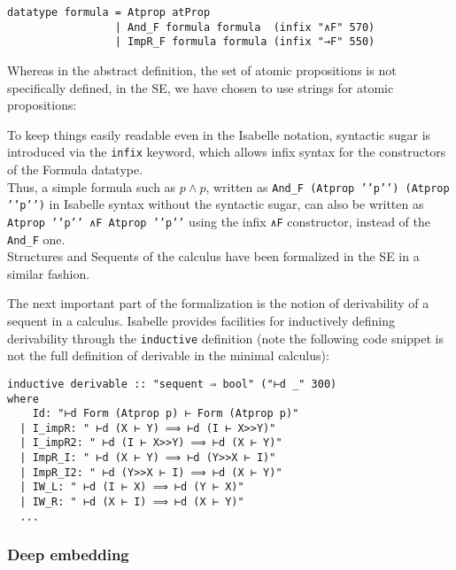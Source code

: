 \begin{verbatim}
datatype formula = Atprop atProp
                 | And_F formula formula  (infix "∧F" 570)
                 | ImpR_F formula formula (infix "→F" 550)
\end{verbatim}

Whereas in the abstract definition, the set of atomic propositions is
not specifically defined, in the SE, we have chosen to use strings for
atomic propositions:

\begin{Shaded}
\begin{Highlighting}[]
  \ErrorTok{=} 
\end{Highlighting}
\end{Shaded}

To keep things easily readable even in the Isabelle notation, syntactic
sugar is introduced via the \texttt{infix} keyword, which allows infix
syntax for the constructors of the Formula datatype.\\Thus, a simple
formula such as $p \land p$, written as
\texttt{And\_F (Atprop ’’p’’) (Atprop ’’p’’)} in Isabelle syntax without
the syntactic sugar, can also be written as
\texttt{Atprop ’’p’’ ∧F Atprop ’’p’’} using the infix \texttt{∧F}
constructor, instead of the \texttt{And\_F} one.\\Structures and
Sequents of the calculus have been formalized in the SE in a similar
fashion.

The next important part of the formalization is the notion of
derivability of a sequent in a calculus. Isabelle provides facilities
for inductively defining derivability through the \texttt{inductive}
definition (note the following code snippet is not the full definition
of derivable in the minimal calculus):

\begin{verbatim}
inductive derivable :: "sequent ⇒ bool" ("⊢d _" 300)
where
    Id: "⊢d Form (Atprop p) ⊢ Form (Atprop p)"
  | I_impR: " ⊢d (X ⊢ Y) ⟹ ⊢d (I ⊢ X>>Y)"
  | I_impR2: " ⊢d (I ⊢ X>>Y) ⟹ ⊢d (X ⊢ Y)"
  | ImpR_I: " ⊢d (X ⊢ Y) ⟹ ⊢d (Y>>X ⊢ I)"
  | ImpR_I2: " ⊢d (Y>>X ⊢ I) ⟹ ⊢d (X ⊢ Y)"
  | IW_L: " ⊢d (I ⊢ X) ⟹ ⊢d (Y ⊢ X)"
  | IW_R: " ⊢d (X ⊢ I) ⟹ ⊢d (X ⊢ Y)"
  ...
\end{verbatim}

\subsubsection{Deep embedding}\label{deep-embedding}

